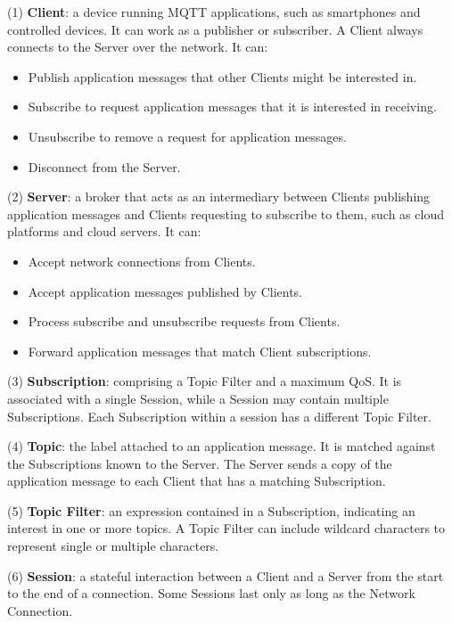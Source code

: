 \documentclass[a4paper,12pt,openany]{book}
\begin{document}
(1) \textbf{Client}: a device running MQTT applications, such as smartphones and controlled devices. It can work as a publisher or subscriber. A Client always connects to the Server over the network. It can:

\begin{itemize}[noitemsep]
    \item  Publish application messages that other Clients might be interested in.
    \item Subscribe to request application messages that it is interested in receiving.
    \item Unsubscribe to remove a request for application messages.
    \item Disconnect from the Server.
\end{itemize}

(2) \textbf{Server}: a broker that acts as an intermediary between Clients publishing application messages and Clients requesting to subscribe to them, such as cloud platforms and cloud servers. It can:

\begin{itemize}[noitemsep]
    \item Accept network connections from Clients.
    \item Accept application messages published by Clients.
    \item Process subscribe and unsubscribe requests from Clients.
    \item Forward application messages that match Client subscriptions.
\end{itemize}

(3) \textbf{Subscription}: comprising a Topic Filter and a maximum QoS. It is associated with a single Session, while a Session may contain multiple Subscriptions. Each Subscription within a session has a different Topic Filter.

(4) \textbf{Topic}: the label attached to an application message. It is matched against the Subscriptions known to the Server. The Server sends a copy of the application message to each Client that has a matching Subscription.

(5) \textbf{Topic Filter}: an expression contained in a Subscription, indicating an interest in one or more topics. A Topic Filter can include wildcard characters to represent single or multiple characters.

(6) \textbf{Session}: a stateful interaction between a Client and a Server from the start to the end of a connection. Some Sessions last only as long as the Network Connection.
\end{document}
